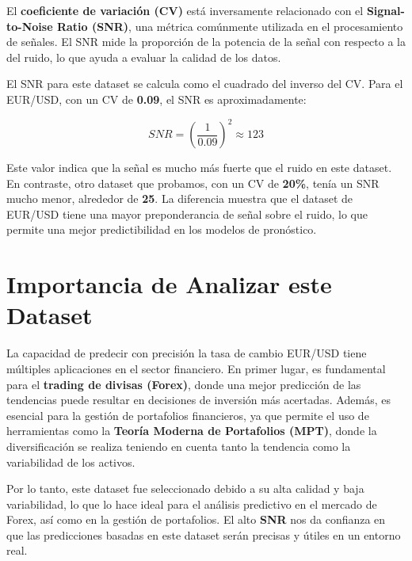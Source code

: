 \documentclass[
]{book}
\begin{document}
El \textbf{coeficiente de variación (CV)} está inversamente relacionado con el \textbf{Signal-to-Noise Ratio (SNR)}, una métrica comúnmente utilizada en el procesamiento de señales. El SNR mide la proporción de la potencia de la señal con respecto a la del ruido, lo que ayuda a evaluar la calidad de los datos.

El SNR para este dataset se calcula como el cuadrado del inverso del CV. Para el EUR/USD, con un CV de \textbf{0.09}, el SNR es aproximadamente:

\[
SNR = \left(\frac{1}{0.09}\right)^2 \approx 123
\]

Este valor indica que la señal es mucho más fuerte que el ruido en este dataset. En contraste, otro dataset que probamos, con un CV de \textbf{20\%}, tenía un SNR mucho menor, alrededor de \textbf{25}. La diferencia muestra que el dataset de EUR/USD tiene una mayor preponderancia de señal sobre el ruido, lo que permite una mejor predictibilidad en los modelos de pronóstico.

\section{Importancia de Analizar este Dataset}\label{importancia-de-analizar-este-dataset}

La capacidad de predecir con precisión la tasa de cambio EUR/USD tiene múltiples aplicaciones en el sector financiero. En primer lugar, es fundamental para el \textbf{trading de divisas (Forex)}, donde una mejor predicción de las tendencias puede resultar en decisiones de inversión más acertadas. Además, es esencial para la gestión de portafolios financieros, ya que permite el uso de herramientas como la \textbf{Teoría Moderna de Portafolios (MPT)}, donde la diversificación se realiza teniendo en cuenta tanto la tendencia como la variabilidad de los activos.

Por lo tanto, este dataset fue seleccionado debido a su alta calidad y baja variabilidad, lo que lo hace ideal para el análisis predictivo en el mercado de Forex, así como en la gestión de portafolios. El alto \textbf{SNR} nos da confianza en que las predicciones basadas en este dataset serán precisas y útiles en un entorno real.

  
\end{document}
